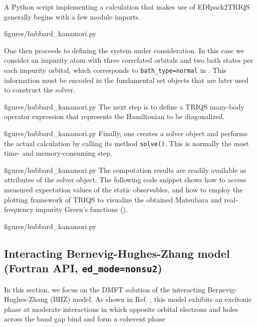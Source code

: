 \documentclass[edipack_sp.tex]{subfiles}
\begin{document}
A Python script implementing a calculation that makes use of EDIpack2TRIQS
generally begins with a few module imports.

{figures/hubbard_kanamori.py}

One then proceeds to defining the system under consideration. In this case we
consider an impurity atom with three correlated orbitals and two bath states
per each impurity orbital, which corresponds to {\tt bath\_type=normal} in \NAME. This information must be encoded in the fundamental
set objects that are later used to construct the solver.

{figures/hubbard_kanamori.py}
The next step is to define a TRIQS many-body operator expression that represents
the Hamiltonian to be diagonalized.

{figures/hubbard_kanamori.py}
Finally, one creates a solver object and performs the actual calculation by
calling its method {\tt solve()}. This is normally the most time- and
memory-consuming step.

{figures/hubbard_kanamori.py}
The computation results are readily available as attributes of the solver
object. The following code snippet shows how to access measured expectation
values of the static observables, and how to employ the plotting framework of
TRIQS to visualize the obtained Matsubara and real-frequency impurity Green's
functions ().

{figures/hubbard_kanamori.py}


















\subsection{Interacting Bernevig-Hughes-Zhang model (Fortran API, {\tt ed\_mode=nonsu2})}
In this section, we focus on the DMFT solution of the interacting
Bernevig-Hughes-Zhang (BHZ) model.
As shown in Ref. \cite{Amaricci2023PRB}, this model exhibits an excitonic phase at moderate
interactions in which opposite orbital electrons and holes across the band gap bind and form a coherent phase \cite{Knolle2017PRL,Jia2020,Varsano2020NN,Blason2020PRB,Amaricci2023PRB,Giuli2023PRB}
\end{document}
